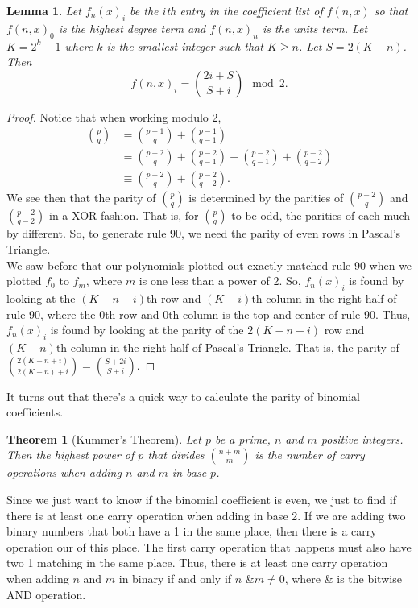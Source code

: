 \documentclass[a4paper]{article}
\newtheorem{lemma}{Lemma}
\newtheorem{theorem}{Theorem}
\begin{document}
	\begin{lemma}
		Let $f_n(x)_i$ be the $i$th entry in the coefficient list of $f(n,x)$ so that $f(n,x)_0$ is the highest degree term and $f(n,x)_n$ is the units term.
		Let $K = 2^k - 1$ where $k$ is the smallest integer such that $K \geq n$.
		Let $S = 2(K-n)$.
		Then
		\begin{equation*}
			f(n,x)_i = \binom{2i + S}{S + i} \mod 2.
		\end{equation*}	
	\end{lemma}
	\begin{proof}
		Notice that when working modulo 2,
		\begin{align*}
			\binom{p}{q} &= \binom{p-1}{q} + \binom{p-1}{q-1} \\
				&= \binom{p-2}{q} + \binom{p-2}{q-1} + \binom{p-2}{q-1} + \binom{p-2}{q-2} \\
				&\equiv \binom{p-2}{q} + \binom{p-2}{q-2}.
		\end{align*}
		We see then that the parity of $\binom{p}{q}$ is determined by the parities of $\binom{p-2}{q}$ and $\binom{p-2}{q-2}$ in a XOR fashion.
		That is, for $\binom{p}{q}$ to be odd, the parities of each much by different.
		So, to generate rule 90, we need the parity of even rows in Pascal's Triangle. \\
		
		We saw before that our polynomials plotted out exactly matched rule 90 when we plotted $f_0$ to $f_m$, where $m$ is one less than a power of 2.
		So, $f_n(x)_i$ is found by looking at the $(K-n+i)$th row and $(K-i)$th column in the right half of rule 90, where the 0th row and 0th column is the top and center of rule 90.
		Thus, $f_n(x)_i$ is found by looking at the parity of the $2(K-n+i)$ row and $(K-n)$th column in the right half of Pascal's Triangle.
		That is, the parity of $\binom{2(K-n+i)}{2(K-n) + i} = \binom{S + 2i}{S + i}$.
	\end{proof}

	It turns out that there's a quick way to calculate the parity of binomial coefficients.
	\begin{theorem}[Kummer's Theorem]
		Let $p$ be a prime, $n$ and $m$ positive integers.
		Then the highest power of $p$ that divides $\binom{n+m}{m}$ is the number of carry operations when adding $n$ and $m$ in base $p$.
	\end{theorem}

	Since we just want to know if the binomial coefficient is even, we just to find if there is at least one carry operation when adding in base 2.
	If we are adding two binary numbers that both have a 1 in the same place, then there is a carry operation our of this place.
	The first carry operation that happens must also have two 1 matching in the same place.
	Thus, there is at least one carry operation when adding $n$ and $m$ in binary if and only if $n \texttt{ \& } m \neq 0$, where $\texttt{\&}$ is the bitwise AND operation.
	
\end{document}
